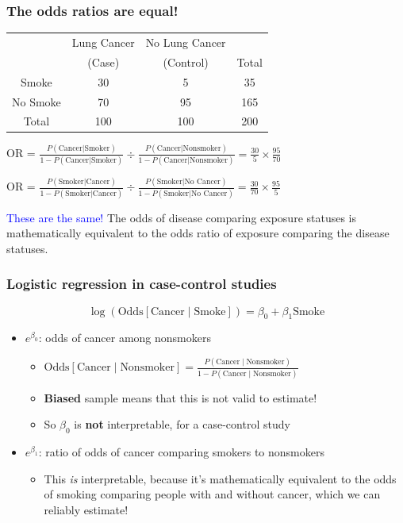 \documentclass[12pt, 
hyperref={colorlinks=true, linkcolor=blue, urlcolor=cyan}]{beamer}
\begin{document}
\begin{frame}
\frametitle{The odds ratios are equal!}
\begin{center}
\begin{table}
	\begin{tabular}{|c|cc|c|}
	\hline 
	& Lung Cancer & No Lung Cancer &  \\ 
	& (Case) & (Control) & Total  \\
	\hline 
	Smoke & 30 & 5  & 35 \\ 
	No Smoke & 70 & 95 & 165  \\ 
	\hline 
	Total & 100 & 100 & 200 \\ 
	\hline 
	\end{tabular}
\end{table}
\end{center}

OR = $\frac{P(\text{Cancer}|\text{Smoker})}{1-P(\text{Cancer}|\text{Smoker})} \div \frac{P(\text{Cancer}|\text{Nonsmoker})}{1-P(\text{Cancer}|\text{Nonsmoker})} = \frac{30}{5}\times \frac{95}{70} $

OR = $\frac{P(\text{Smoker}|\text{Cancer})}{1-P(\text{Smoker}|\text{Cancer})} \div \frac{P(\text{Smoker}|\text{No Cancer})}{1-P(\text{Smoker}|\text{No Cancer})} = \frac{30}{70} \times \frac{95}{5}$

\textcolor{blue}{These are the same!}
The odds of disease comparing exposure statuses is mathematically equivalent to the odds ratio of exposure comparing the disease statuses.
\end{frame}

\begin{frame}
\frametitle{Logistic regression in case-control studies}
$$\log\left(\text{Odds}[\text{Cancer}\mid \text{Smoke}]\right) = \beta_0 + \beta_1 \text{Smoke}$$

\begin{itemize}
\item $e^{\beta_0}$: odds of cancer among nonsmokers \pause
	\begin{itemize}  
	\item $\text{Odds}[\text{Cancer} \mid \text{Nonsmoker}] = \frac{P(\text{Cancer} \mid \text{Nonsmoker})}{1-P(\text{Cancer} \mid \text{Nonsmoker})}$ \pause
	\item \textbf{Biased} sample means that this is not valid to estimate! 
	\item So $\beta_0$ is \textbf{not} interpretable, for a case-control study \pause
	\end{itemize}
\item $e^{\beta_1}$: ratio of odds of cancer comparing smokers to nonsmokers \pause
	\begin{itemize}
	\item This \textit{is} interpretable, because it's mathematically equivalent to the odds of smoking comparing people with and without cancer, which we can reliably estimate!
	\end{itemize}
\end{itemize}

\end{frame}
\end{document}
